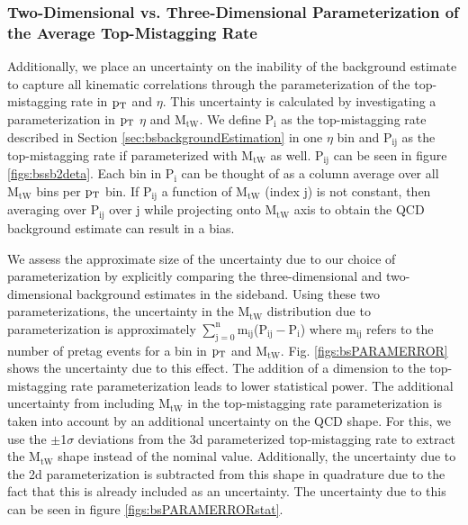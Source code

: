 \subsubsection{Two-Dimensional  vs. Three-Dimensional Parameterization of the Average Top-Mistagging Rate}
\label{sec:bsparamerrors1}
Additionally, we place an uncertainty on the inability of the
background estimate to capture all kinematic correlations through the
parameterization of the top-mistagging rate in $\mathrm{p_{T}}$ and $\eta$.
This uncertainty is calculated by investigating a parameterization in
$\mathrm{p_{T}}$ $\eta$ and $\mathrm{M_{tW}}$.  We define $\mathrm{P_i}$ as the top-mistagging
rate described in Section \ref{sec:bsbackgroundEstimation} in one
$\eta$ bin and $\mathrm{P_{ij}}$ as the top-mistagging rate if parameterized
with $\mathrm{M_{tW}}$ as well.  $\mathrm{P_{ij}}$ can be seen in
figure \ref{figs:bssb2deta}.  Each bin in $\mathrm{P_i}$ can be thought of as a
column average over all $\mathrm{M_{tW}}$ bins per $\mathrm{p_{T}}$ bin.  If $\mathrm{P_{ij}}$ a
function of $\mathrm{M_{tW}}$ (index $\mathrm{j}$) is not constant, then averaging over
$\mathrm{P_{ij}}$ over $\mathrm{j}$ while projecting onto $\mathrm{M_{tW}}$ axis to obtain the
QCD background estimate can result in a bias.  

We assess the approximate size of the uncertainty due to our choice of
parameterization by explicitly comparing the three-dimensional and
two-dimensional background estimates in the sideband.  Using these two
parameterizations, the uncertainty in the $\mathrm{M_{tW}}$ distribution due to
parameterization is approximately $\mathrm{\displaystyle\sum\limits_{j=0}^n
m_{ij}}$($\mathrm{P_{ij}-P_i}$) where $\mathrm{m_{ij}}$ refers to the number of pretag
events for a bin in $\mathrm{p_{T}}$ and $\mathrm{M_{tW}}$.  Fig. \ref{figs:bsPARAMERROR}
shows the uncertainty due to this effect.  The addition of a dimension to the top-mistagging rate parameterization 
leads to lower statistical power.  The additional uncertainty from including $\mathrm{M_{tW}}$ in the top-mistagging rate 
parameterization is taken into account by an additional uncertainty on the QCD shape.  For this, we use the $\pm$1$\sigma$ deviations from the 3d parameterized top-mistagging rate to 
extract the $\mathrm{M_{tW}}$ shape instead of the nominal value.  Additionally, the uncertainty due to the 2d parameterization is subtracted from this shape in quadrature due to the fact that this is already included as an uncertainty.  
The uncertainty due to this can be seen in figure \ref{figs:bsPARAMERRORstat}.

